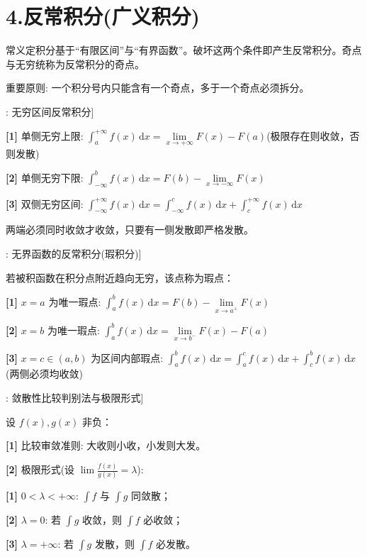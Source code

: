 \documentclass[11pt,a4paper,UTF8]{ctexart}
\begin{document}
\section{4.反常积分(广义积分)}

常义定积分基于“有限区间”与“有界函数”。破坏这两个条件即产生反常积分。奇点与无穷统称为反常积分的奇点。

\begin{solbox}[分步推导与答题规范]
重要原则: 一个积分号内只能含有一个奇点，多于一个奇点必须拆分。
\end{solbox}

\begin{thmbox}[概念[1]: 无穷区间反常积分]

\textbf{[1]} 单侧无穷上限: $\int_a^{+\infty} f(x)\,\mathrm{d}x = \lim\limits_{x \to +\infty} F(x) - F(a)$(极限存在则收敛，否则发散)

\textbf{[2]} 单侧无穷下限: $\int_{-\infty}^b f(x)\,\mathrm{d}x = F(b) - \lim\limits_{x \to -\infty} F(x)$

\textbf{[3]} 双侧无穷区间: $\int_{-\infty}^{+\infty} f(x)\,\mathrm{d}x = \int_{-\infty}^{c} f(x)\,\mathrm{d}x + \int_c^{+\infty} f(x)\,\mathrm{d}x$

两端必须同时收敛才收敛，只要有一侧发散即严格发散。

\end{thmbox}
\begin{thmbox}[概念[2]: 无界函数的反常积分(瑕积分)]

若被积函数在积分点附近趋向无穷，该点称为瑕点：

\textbf{[1]} $x = a$ 为唯一瑕点: $\int_a^b f(x)\,\mathrm{d}x = F(b) - \lim\limits_{x \to a^+} F(x)$

\textbf{[2]} $x = b$ 为唯一瑕点: $\int_a^b f(x)\,\mathrm{d}x = \lim\limits_{x \to b^-} F(x) - F(a)$

\textbf{[3]} $x = c \in (a, b)$ 为区间内部瑕点: $\int_a^b f(x)\,\mathrm{d}x = \int_a^c f(x)\,\mathrm{d}x + \int_c^b f(x)\,\mathrm{d}x$(两侧必须均收敛)

\end{thmbox}
\begin{thmbox}[定理[1]: 敛散性比较判别法与极限形式]

设 $f(x), g(x)$ 非负：

\textbf{[1]} 比较审敛准则: 大收则小收，小发则大发。

\textbf{[2]} 极限形式(设 $\lim \frac{f(x)}{g(x)} = \lambda$):

\textbf{[1]} $0 < \lambda < +\infty$: $\int f$ 与 $\int g$ 同敛散；

\textbf{[2]} $\lambda = 0$: 若 $\int g$ 收敛，则 $\int f$ 必收敛；

\textbf{[3]} $\lambda = +\infty$: 若 $\int g$ 发散，则 $\int f$ 必发散。

\end{thmbox}
\end{document}

